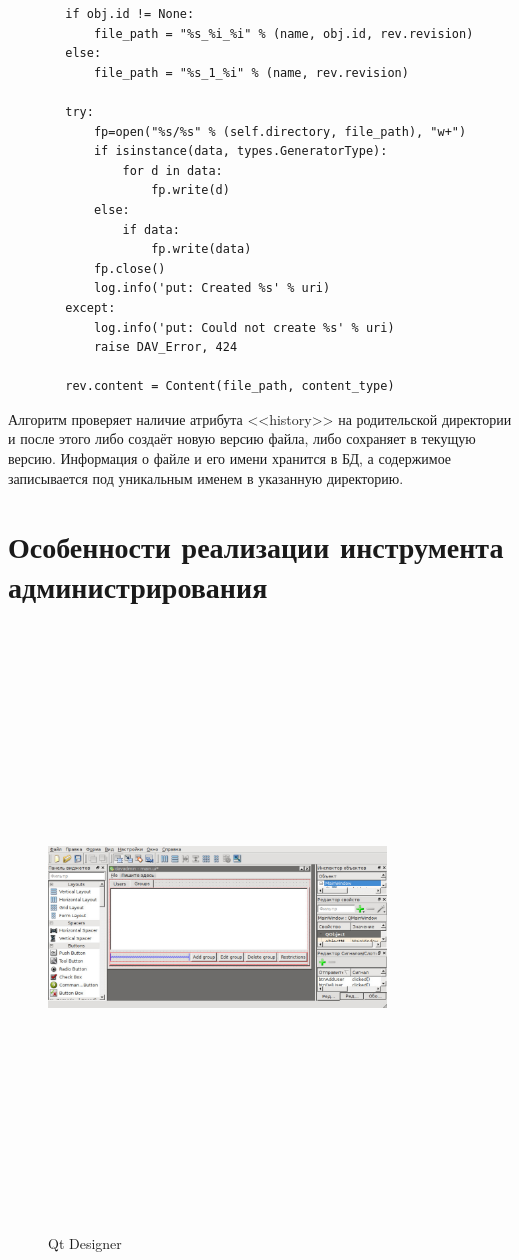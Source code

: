 \documentclass[utf8,usehyperref,12pt]{G7-32}
\begin{document}
\begin{lstlisting}
        if obj.id != None:
            file_path = "%s_%i_%i" % (name, obj.id, rev.revision)
        else:
            file_path = "%s_1_%i" % (name, rev.revision)
        
        try:
            fp=open("%s/%s" % (self.directory, file_path), "w+")
            if isinstance(data, types.GeneratorType):
                for d in data:
                    fp.write(d)
            else:
                if data:
                    fp.write(data)
            fp.close()
            log.info('put: Created %s' % uri)
        except:
            log.info('put: Could not create %s' % uri)
            raise DAV_Error, 424
        
        rev.content = Content(file_path, content_type) 
\end{lstlisting}

Алгоритм проверяет наличие атрибута <<history>> на родительской директории и после этого либо создаёт новую версию файла, либо сохраняет в текущую версию. Информация о файле и его имени хранится в БД, а содержимое записывается под уникальным именем в указанную директорию.

\section{Особенности реализации инструмента администрирования}

\begin{figure}[ht!]
   \centering%
   \includegraphics[height=160mm, width=0.8\textwidth, clip, keepaspectratio]{pictures/qt_designer}
   \caption{Qt Designer}\label{fig:qt_designer}
\end{figure}
\end{document}
